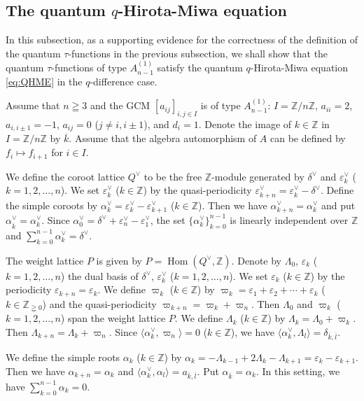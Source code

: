 \documentclass[12pt,twoside]{article}
\newcommand\bra{\langle}
\newcommand\ket{\rangle}
\newcommand\Hom{\mathop{\mathrm{Hom}}\nolimits}
\newcommand\av{\alpha^\vee}
\newcommand\eps{\varepsilon}
\newcommand\epsv{\eps^\vee}
\newcommand\deltav{\delta^\vee}
\newcommand\Qv{Q^\vee}
\newcommand\Z{{\mathbb Z}} %
\theoremstyle{plain} %
\theoremstyle{definition} %
\theoremstyle{definition} %
\numberwithin{theorem}{section}
\numberwithin{equation}{section}
\numberwithin{figure}{section}
\numberwithin{table}{section}
\begin{document}

\subsection{The quantum $q$-Hirota-Miwa equation}
\label{sec:QHME}

In this subsection, as a supporting evidence for the correctness of
the definition of the quantum $\tau$-functions in the previous subsection, 
we shall show that the quantum $\tau$-functions of type $A^{(1)}_{n-1}$ satisfy
the quantum $q$-Hirota-Miwa equation \eqref{eq:QHME} in the $q$-difference case.

Assume that $n\geqq 3$ and the GCM $[a_{ij}]_{i,j\in I}$ is of type $A^{(1)}_{n-1}$:
$I=\Z/n\Z$, $a_{ii}=2$, $a_{i,i\pm1}=-1$, $a_{ij}=0$ ($j\ne i,i\pm1$),
and $d_i=1$.
Denote the image of $k\in\Z$ in $I=\Z/n\Z$ by $\overline{k}$.
Assume that the algebra automorphism of $A$ can be defined by 
$f_i\mapsto f_{i+1}$ for $i\in I$.

We define the coroot lattice $\Qv$ to be the free $\Z$-module generated 
by $\deltav$ and $\epsv_k$ ($k=1,2,\ldots,n$).
We set $\epsv_k$ ($k\in\Z$) by the quasi-periodicity $\epsv_{k+n}=\epsv_k-\deltav$.
Define the simple coroots by $\av_k=\epsv_k-\epsv_{k+1}$ ($k\in\Z$). 
Then we have $\av_{k+n}=\av_k$ and put $\av_{\overline{k}}=\av_k$. 
Since $\av_0=\deltav+\epsv_n-\epsv_1$, 
the set $\{\av_k\}_{k=0}^{n-1}$ is linearly independent over $\Z$
and $\sum_{k=0}^{n-1}\av_k=\deltav$.

The weight lattice $P$ is given by $P=\Hom(\Qv,\Z)$.
Denote by $\Lambda_0$, $\eps_k$ ($k=1,2,\ldots,n$)
the dual basis of $\deltav$, $\epsv_k$ ($k=1,2,\dots,n$).
We set $\eps_k$ ($k\in\Z$) by the periodicity $\eps_{k+n}=\eps_k$.
We define $\varpi_k$ ($k\in\Z$) by
$\varpi_k=\eps_1+\eps_2+\cdots+\eps_k$ ($k\in\Z_{\geqq0}$)
and the quasi-periodicity $\varpi_{k+n}=\varpi_k+\varpi_n$.
Then $\Lambda_0$ and $\varpi_k$ ($k=1,2,\ldots,n$) span the weight lattice $P$.
We define $\Lambda_k$ ($k\in\Z$) by
$\Lambda_k=\Lambda_0+\varpi_k$.
Then $\Lambda_{k+n}=\Lambda_k+\varpi_n$.
Since $\bra\av_k,\varpi_n\ket=0$ ($k\in\Z$), 
we have $\bra\av_k,\Lambda_l\ket=\delta_{\overline{k},\overline{l}}$.

We define the simple roots $\alpha_k$ ($k\in\Z$) by \(
 \alpha_k
 =-\Lambda_{k-1}+2\Lambda_k-\Lambda_{k+1}
 = \eps_k-\eps_{k+1}
\). Then we have $\alpha_{k+n}=\alpha_k$
and $\bra\av_k,\alpha_l\ket=a_{\overline{k},\overline{l}}$. 
Put $\alpha_{\overline{k}}=\alpha_k$.
In this setting, we have $\sum_{k=0}^{n-1}\alpha_k=0$.
\end{document}
